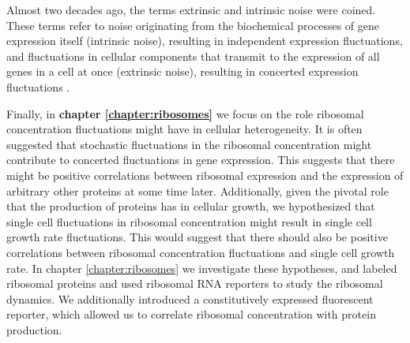 Almost two decades ago, the terms extrinsic and intrinsic noise were coined.
%
These terms refer to noise originating from the biochemical processes of gene expression itself (intrinsic noise), resulting in independent expression fluctuations,
and fluctuations in cellular components that transmit to the expression of all genes in a cell at once (extrinsic noise), resulting in concerted expression fluctuations \cite{Elowitz2002}.


Finally, in \textbf{chapter \ref{chapter:ribosomes}} we focus on the role ribosomal concentration fluctuations might have in cellular heterogeneity.
%
%
It is often suggested that stochastic fluctuations in the ribosomal concentration might 
contribute to concerted fluctuations in gene expression. 
This suggests that there might be 
positive correlations between ribosomal expression and the expression of arbitrary other proteins at some time later.
%
Additionally, given the pivotal role that the production of proteins has in cellular growth, 
we hypothesized that single cell fluctuations in ribosomal concentration 
might result in single cell growth rate fluctuations.
This would suggest that there should also be positive correlations between ribosomal concentration fluctuations and single cell growth rate.
%
In chapter \ref{chapter:ribosomes} we investigate these hypotheses,
and labeled ribosomal proteins and used ribosomal RNA reporters to study the ribosomal dynamics.
%
We additionally introduced 
a constitutively expressed fluorescent reporter, which allowed us to 
correlate ribosomal concentration with protein production.
